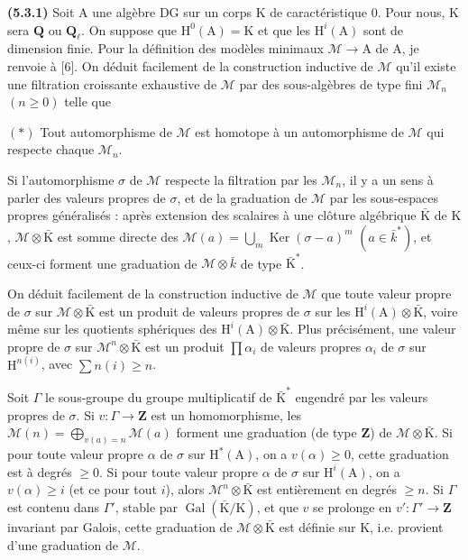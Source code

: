 \documentclass[11pt,leqno]{article}
\begin{document}
\textbf{(5.3.1)} Soit \(\mathrm{A}\) une algèbre DG sur un corps \(\mathrm{K}\) de caractéristique \(0\). Pour nous, \(\mathrm{K}\) sera \(\mathbf{Q}\) ou \(\mathbf{Q}_{\ell}\). On suppose que \(\mathrm{H}^0(\mathrm{A})=\mathrm{K}\) et que les \(\mathrm{H}^i(\mathrm{A})\) sont de dimension finie. Pour la définition des modèles minimaux \(\mathcal{M}\to\mathrm{A}\) de \(\mathrm{A}\), je renvoie à [6]. On déduit facilement de la construction inductive de \(\mathcal{M}\) qu’il existe une filtration croissante exhaustive de \(\mathcal{M}\) par des sous-algèbres de type fini \(\mathcal{M}_n\) \((n\geq0)\) telle que

\((*)\) Tout automorphisme de \(\mathcal{M}\) est homotope à un automorphisme de \(\mathcal{M}\) qui respecte chaque \(\mathcal{M}_n\).

Si l’automorphisme \(\sigma\) de \(\mathcal{M}\) respecte la filtration par les \(\mathcal{M}_n\), il y a un sens à parler des valeurs propres de \(\sigma\), et de la graduation de \(\mathcal{M}\) par les sous-espaces propres généralisés : après extension des scalaires à une clôture algébrique \(\bar{\mathrm{K}}\) de \(\mathrm{K}\), \(\mathcal{M}\otimes\bar{\mathrm{K}}\) est somme directe des \(\mathcal{M}(a)=\bigcup\limits_m\operatorname{Ker}(\sigma-a)^m\) \((a\in\bar{k}^*)\), et ceux-ci forment une graduation de \(\mathcal{M}\otimes\bar{k}\) de type \(\bar{\mathrm{K}}^*\).

On déduit facilement de la construction inductive de \(\mathcal{M}\) que toute valeur propre de \(\sigma\) sur \(\mathcal{M}\otimes\bar{\mathrm{K}}\) est un produit de valeurs propres de \(\sigma\) sur les \(\mathrm{H}^i(\mathrm{A})\otimes\bar{\mathrm{K}}\), voire même sur les quotients sphériques des \(\mathrm{H}^i(\mathrm{A})\otimes\bar{\mathrm{K}}\). Plus précisément, une valeur propre de \(\sigma\) sur \(\mathcal{M}^n\otimes\bar{\mathrm{K}}\) est un produit \(\prod\alpha_i\) de valeurs propres \(\alpha_i\) de \(\sigma\) sur \(\mathrm{H}^{n(i)}\), avec \(\sum n(i)\geq n\).

Soit \(\Gamma\) le sous-groupe du groupe multiplicatif de \(\bar{\mathrm{K}}^*\) engendré par les valeurs propres de \(\sigma\). Si \(v:\Gamma\to\mathbf{Z}\) est un homomorphisme, les \(\mathcal{M}(n)=\bigoplus\limits_{v(a)=n}\mathcal{M}(a)\) forment une graduation (de type \(\mathbf{Z}\)) de \(\mathcal{M}\otimes\bar{\mathrm{K}}\). Si pour toute valeur propre \(\alpha\) de \(\sigma\) sur \(\mathrm{H}^*(\mathrm{A})\), on a \(v(\alpha)\geq0\), cette graduation est à degrés \(\geq0\). Si pour toute valeur propre \(\alpha\) de \(\sigma\) sur \(\mathrm{H}^i(\mathrm{A})\), on a \(v(\alpha)\geq i\) (et ce pour tout \(i\)), alors \(\mathcal{M}^n\otimes\bar{\mathrm{K}}\) est entièrement en degrés \(\geq n\). Si \(\Gamma\) est contenu dans \(\Gamma'\), stable par \(\operatorname{Gal}(\bar{\mathrm{K}}/\mathrm{K})\), et que \(v\) se prolonge en \(v':\Gamma'\to\mathbf{Z}\) invariant par Galois, cette graduation de \(\mathcal{M}\otimes\bar{\mathrm{K}}\) est définie sur \(\mathrm{K}\), i.e. provient d’une graduation de \(\mathcal{M}\).
\end{document}
